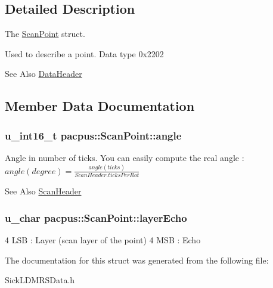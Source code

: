\subsection{Detailed Description}
The \hyperlink{structpacpus_1_1ScanPoint}{Scan\-Point} struct. 

Used to describe a point. Data type 0x2202 \begin{DoxySeeAlso}{See Also}
\hyperlink{structpacpus_1_1DataHeader}{Data\-Header} 
\end{DoxySeeAlso}


\subsection{Member Data Documentation}
\hypertarget{structpacpus_1_1ScanPoint_af551038f4f967b5289f50c9454bc8619}{
\subsubsection[{angle}]{\setlength{\rightskip}{0pt plus 5cm}u\-\_\-int16\-\_\-t pacpus\-::\-Scan\-Point\-::angle}}\label{structpacpus_1_1ScanPoint_af551038f4f967b5289f50c9454bc8619}
Angle in number of ticks. You can easily compute the real angle \-: $ angle (degree) = \frac{angle (ticks)}{ScanHeader.ticksPerRot}$ \begin{DoxySeeAlso}{See Also}
\hyperlink{structpacpus_1_1ScanHeader}{Scan\-Header} 
\end{DoxySeeAlso}
\hypertarget{structpacpus_1_1ScanPoint_a300ce0213fd1a9ea59687f29b68046bc}{
\subsubsection[{layer\-Echo}]{\setlength{\rightskip}{0pt plus 5cm}u\-\_\-char pacpus\-::\-Scan\-Point\-::layer\-Echo}}\label{structpacpus_1_1ScanPoint_a300ce0213fd1a9ea59687f29b68046bc}
4 L\-S\-B \-: Layer (scan layer of the point) 4 M\-S\-B \-: Echo 

The documentation for this struct was generated from the following file\-:\begin{DoxyCompactItemize}
\item 
Sick\-L\-D\-M\-R\-S\-Data.\-h\end{DoxyCompactItemize}
